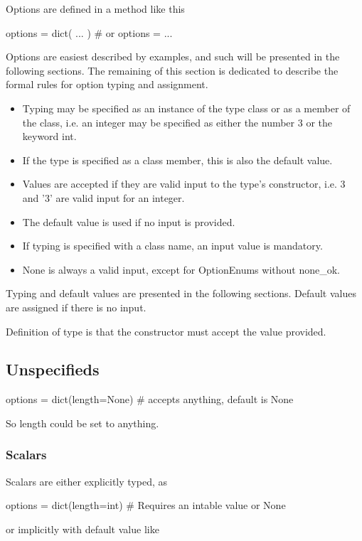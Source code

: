 Options are defined in a method like this

\begin{python}
  options = dict( ... )  # or
  options = { ... }
\end{python}

Options are easiest described by examples, and such will be presented
in the following sections.  The remaining of this section is dedicated
to describe the formal rules for option typing and assignment.

 \begin{itemize}
 \item Typing may be specified as an instance of the type class or as a
   member of the class, i.e. an integer may be specified as either the
   number 3 or the keyword int.
 \item If the type is specified as a class member, this is also the
   default value.
 \item Values are accepted if they are valid input to the type's
   constructor, i.e. 3 and '3' are valid input for an integer.
 \item The default value is used if no input is provided.
 \item If typing is specified with a class name, an input value is mandatory.
 \item None is always a valid input, except for OptionEnums without
   none\_ok.
\end{itemize}


Typing and default values are presented in the following sections.
Default values are assigned if there is no input.

Definition of type is that the constructor must accept the value
provided.


\subsection{Unspecifieds}
\begin{python}
  options = dict(length=None)
  # accepts anything, default is None
\end{python}
So length could be set to anything.



\subsubsection*{Scalars}
Scalars are either explicitly typed, as

\begin{python}
  options = dict(length=int)
  # Requires an intable value or None
\end{python}
or implicitly with default value like

